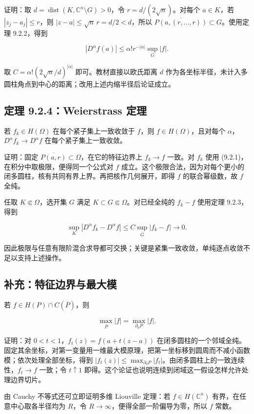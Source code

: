 \documentclass[11pt,a4paper]{article}
\begin{document}
证明：取 \(d=\operatorname{dist}(K,\mathbb C^n\setminus G)>0\)，令
\(r=d/(2\sqrt n)\)。对每个 \(a\in K\)，若 \(|z_j-a_j|\le r\)，则
\(|z-a|\le\sqrt n\,r=d/2<d\)，所以
\(\overline{P(a,(r,\ldots,r))}\subset G\)。使用定理 9.2.2，得到

\[
|D^\alpha f(a)|\le\alpha!r^{-|\alpha|}\sup_G|f|.
\]

取 \(C=\alpha!(2\sqrt n/d)^{|\alpha|}\) 即可。教材直接以欧氏距离 \(d\)
作为各坐标半径，未计入多圆柱角点到中心的距离；改用上述内缩半径后论证成立。

\subsection{定理 9.2.4：Weierstrass 定理}\label{ch09-s2-heading-5}

若 \(f_k\in H(\Omega)\) 在每个紧子集上一致收敛于 \(f\)，则
\(f\in H(\Omega)\)，且对每个 \(\alpha\)，\(D^\alpha f_k\to D^\alpha f\)
在每个紧子集上一致收敛。

证明：固定 \(\overline{P(a,r)}\subset\Omega\)，在它的特征边界上
\(f_k\to f\) 一致。对 \(f_k\) 使用
(9.2.1)，在积分中取极限，便得同一个公式对 \(f\)
成立。这个极限合法，因为对每个更小的闭多圆柱，核有共同有界上界。再把核作几何展开，即得
\(f\) 的联合幂级数，故 \(f\) 全纯。

任取 \(K\Subset\Omega\)，选开集 \(G\) 满足
\(K\subset G\Subset\Omega\)。对已经全纯的 \(f_k-f\) 使用定理 9.2.3，得到

\[
\sup_K|D^\alpha f_k-D^\alpha f|
\le C\sup_{\overline G}|f_k-f|\longrightarrow0.
\]

因此极限与任意有限阶混合求导都可交换；关键是紧集一致收敛，单纯逐点收敛不足以支持上述操作。

\subsection*{补充：特征边界与最大模}\label{ch09-s2-heading-6}

若 \(f\in H(P)\cap C(\overline P)\)，则

\[
\max_{\overline P}|f|=\max_{\partial_0P}|f|.
\]

证明：对 \(0<t<1\)，\(f_t(z)=f(a+t(z-a))\)
在闭多圆柱的一个邻域全纯。固定其余坐标，对第一变量用一维最大模原理，把第一坐标移到圆周而不减小函数模；依次处理全部坐标，得到
\(|f_t(z)|\le\max_{\partial_0P}|f_t|\)。由闭多圆柱上的一致连续性，\(f_t\to f\)
一致；令 \(t\uparrow1\)
即得。这个论证也说明连续到闭域这一假设怎样允许处理边界切片。

由 Cauchy 不等式还可立即证明多维 Liouville 定理：若
\(f\in H(\mathbb C^n)\) 有界，在任意中心取各半径均为 \(R\)，令
\(R\to\infty\)，便得全部一阶偏导为零，所以 \(f\) 常数。
\end{document}
